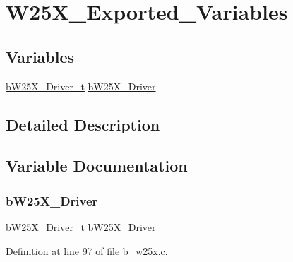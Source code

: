 \hypertarget{group___w25_x___exported___variables}{}\section{W25\+X\+\_\+\+Exported\+\_\+\+Variables}
\label{group___w25_x___exported___variables}
\subsection*{Variables}
\begin{DoxyCompactItemize}
\item 
\mbox{\hyperlink{group___w25_x___exported___types_definitions_gadda45650bf6c5ce0216af3f25bb453dc}{b\+W25\+X\+\_\+\+Driver\+\_\+t}} \mbox{\hyperlink{group___w25_x___exported___variables_gaf32f0de405f6f704a717654d70349629}{b\+W25\+X\+\_\+\+Driver}}
\end{DoxyCompactItemize}


\subsection{Detailed Description}


\subsection{Variable Documentation}
\mbox{\label{group___w25_x___exported___variables_gaf32f0de405f6f704a717654d70349629}} 
\subsubsection{\texorpdfstring{b\+W25\+X\+\_\+\+Driver}{bW25X\_Driver}}
{\footnotesize\ttfamily \mbox{\hyperlink{group___w25_x___exported___types_definitions_gadda45650bf6c5ce0216af3f25bb453dc}{b\+W25\+X\+\_\+\+Driver\+\_\+t}} b\+W25\+X\+\_\+\+Driver}



Definition at line 97 of file b\+\_\+w25x.\+c.

